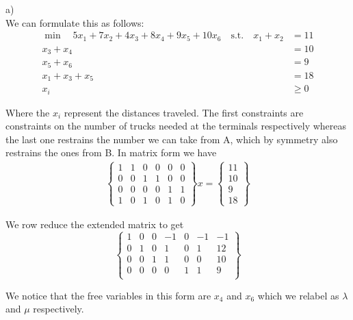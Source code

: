\documentclass{article}
\begin{document}
  a)\\
  We can formulate this as follows:\\
  \begin{align}
	  \min \quad 5x_1 + 7x_2 + 4x_3 + 8x_4 + 9x_5 + 10x_6 \quad \text{s.t.} \quad x_1 + x_2 &= 11\\
	  x_3 + x_4 &= 10\\
	  x_5 + x_6 &= 9\\
	  x_1 + x_3 + x_5 &= 18\\
	  x_i &\ge 0
  \end{align}
  
  Where the $x_i$ represent the distances traveled. The first constraints are constraints on the number of trucks needed at the terminals respectively whereas the last one restrains the number we can take from A, which by symmetry also restrains the ones from B. 
  In matrix form we have
  \begin{align}
  	\begin{Bmatrix}
  	1 & 1 & 0 & 0 & 0 & 0 \\
  	0 & 0 & 1 & 1 & 0 & 0 \\
  	0 & 0 & 0 & 0 & 1 & 1 \\
  	1 & 0 & 1 & 0 & 1 & 0 
  	\end{Bmatrix}
  	x = 
  	\begin{Bmatrix}
  	11 \\ 10 \\ 9 \\ 18
  	\end{Bmatrix}
  \end{align}
  
  We row reduce the extended matrix to get 
  \begin{equation}
  	\begin{Bmatrix}
  	1 & 0 & 0 & -1 & 0 & -1 & -1 \\
  	0 & 1 & 0 & 1 & 0 & 1 & 12 \\
  	0 & 0 & 1 & 1 & 0 & 0 & 10 \\
  	0 & 0 & 0 & 0 & 1 & 1 & 9 \\
  	\end{Bmatrix}
  \end{equation}
  
  We notice that the free variables in this form are $x_4$ and $x_6$ 
  which we relabel as $\lambda$ and $\mu$ respectively.
  
\end{document}
